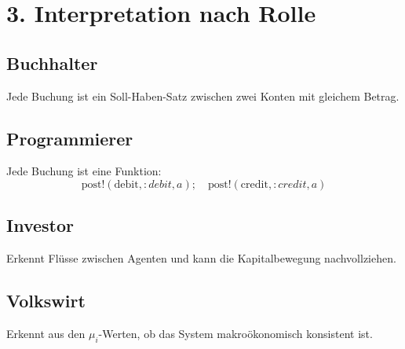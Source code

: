 \documentclass{article}
\begin{document}
\section*{3. Interpretation nach Rolle}

\subsection*{Buchhalter}

Jede Buchung ist ein Soll-Haben-Satz zwischen zwei Konten mit gleichem Betrag.

\subsection*{Programmierer}

Jede Buchung ist eine Funktion:
\[
\text{post!}(\text{debit}, :debit, a); \quad \text{post!}(\text{credit}, :credit, a)
\]

\subsection*{Investor}

Erkennt Flüsse zwischen Agenten und kann die Kapitalbewegung nachvollziehen.

\subsection*{Volkswirt}

Erkennt aus den \( \mu_i \)-Werten, ob das System makroökonomisch konsistent ist.
\end{document}
